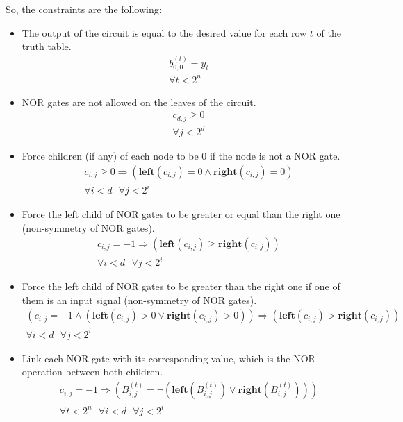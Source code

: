 \documentclass[letterpaper,10pt]{article}
\begin{document}
So, the constraints are the following:
\begin{itemize}
    \item The output of the circuit is equal to the desired value for each row $t$ of the truth table.
    \begin{align*}
        b_{0,0}^{(t)} = y_t \\
        \forall t < 2^n
    \end{align*}
    \item NOR gates are not allowed on the leaves of the circuit.
    \begin{align*}
        c_{d,j} \geq 0 \\
        \forall j < 2^d 
    \end{align*}
    \item Force children (if any) of each node to be 0 if the node is not a NOR gate.
    \begin{align*}
        c_{i,j} \geq 0 \Rightarrow (\mathbf{left}(c_{i,j}) = 0 \land \mathbf{right}(c_{i,j}) = 0) \\
        \forall i < d\text{ }\forall j < 2^i
    \end{align*}
    \item Force the left child of NOR gates to be greater or equal than the right one (non-symmetry of NOR gates).
    \begin{align*}
        c_{i,j} = -1 \Rightarrow (\mathbf{left}(c_{i,j}) \geq \mathbf{right}(c_{i,j})) \\
        \forall i < d\text{ }\forall j < 2^i
    \end{align*}
    \item Force the left child of NOR gates to be greater than the right one if one of them is an input signal (non-symmetry of NOR gates).
    \begin{align*}
        (c_{i,j} = -1 \land (\mathbf{left}(c_{i,j}) > 0 \lor \mathbf{right}(c_{i,j}) > 0)) \Rightarrow (\mathbf{left}(c_{i,j}) > \mathbf{right}(c_{i,j})) \\
        \forall i < d\text{ }\forall j < 2^i
    \end{align*}
    \item Link each NOR gate with its corresponding value, which is the NOR operation between both children.
    \begin{align*}
        c_{i,j} = -1 \Rightarrow (B_{i,j}^{(t)} = \lnot (\mathbf{left}(B_{i,j}^{(t)}) \lor \mathbf{right}(B_{i,j}^{(t)}))) \\
        \forall t < 2^n\text{ }\forall i < d\text{ }\forall j < 2^i

\end{align*}
\end{itemize}
\end{document}
